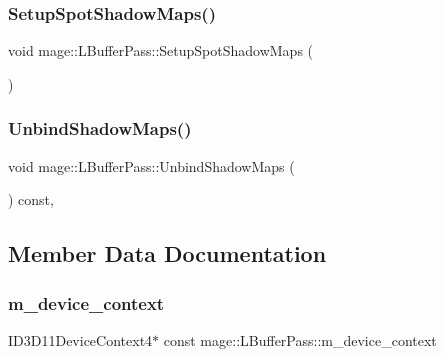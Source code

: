 \hypertarget{structmage_1_1_l_buffer_pass_a1ed3d550173e0145e363132656b8dfdb}{}\label{structmage_1_1_l_buffer_pass_a1ed3d550173e0145e363132656b8dfdb} 
\subsubsection{\texorpdfstring{Setup\+Spot\+Shadow\+Maps()}{SetupSpotShadowMaps()}}
{\footnotesize\ttfamily void mage\+::\+L\+Buffer\+Pass\+::\+Setup\+Spot\+Shadow\+Maps (\begin{DoxyParamCaption}{ }\end{DoxyParamCaption})\hspace{0.3cm}{\ttfamily [private]}}

\hypertarget{structmage_1_1_l_buffer_pass_af7abbf24eb7d20d9604beca5baa71f20}{}\label{structmage_1_1_l_buffer_pass_af7abbf24eb7d20d9604beca5baa71f20} 
\subsubsection{\texorpdfstring{Unbind\+Shadow\+Maps()}{UnbindShadowMaps()}}
{\footnotesize\ttfamily void mage\+::\+L\+Buffer\+Pass\+::\+Unbind\+Shadow\+Maps (\begin{DoxyParamCaption}{ }\end{DoxyParamCaption}) const\hspace{0.3cm}{\ttfamily [private]}, {\ttfamily [noexcept]}}



\subsection{Member Data Documentation}
\hypertarget{structmage_1_1_l_buffer_pass_aa3f3eb2e2e4303398553eb9f07344845}{}\label{structmage_1_1_l_buffer_pass_aa3f3eb2e2e4303398553eb9f07344845} 
\subsubsection{\texorpdfstring{m\+\_\+device\+\_\+context}{m\_device\_context}}
{\footnotesize\ttfamily I\+D3\+D11\+Device\+Context4$\ast$ const mage\+::\+L\+Buffer\+Pass\+::m\+\_\+device\+\_\+context\hspace{0.3cm}{\ttfamily [private]}}

